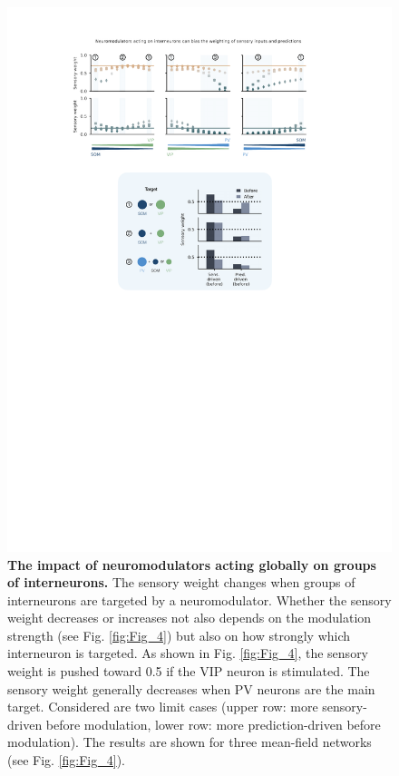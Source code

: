 \documentclass[10pt,a4paper]{article}
\begin{document}
\begin{figure}[!h]
	\centering
    \includegraphics{../results/figures/final/Fig_4_S1.pdf}%
\caption{\footnotesize{\bf The impact of neuromodulators acting globally on groups of interneurons. \newline}  
The sensory weight changes when groups of interneurons are targeted by a neuromodulator. Whether the sensory weight decreases or increases not also depends on the modulation strength (see Fig. \ref{fig:Fig_4}) but also on how strongly which interneuron is targeted.  As shown in Fig. \ref{fig:Fig_4}, the sensory weight is pushed toward 0.5 if the VIP neuron is stimulated. The sensory weight generally decreases when PV neurons are the main target. Considered are two limit cases (upper row: more sensory-driven before modulation, lower row: more prediction-driven before modulation). The results are shown for three mean-field networks (see Fig. \ref{fig:Fig_4}).
}
\label{fig:Fig_4_S1}
\end{figure}
\end{document}
